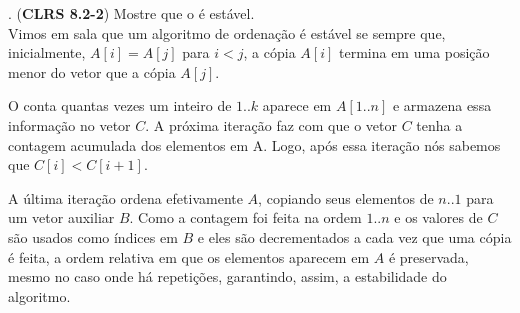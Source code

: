 
. (\textbf{CLRS 8.2-2}) Mostre que o  é estável.\\[6pt]

Vimos em sala que um algoritmo de ordenação é estável se sempre que, inicialmente, $A[i] = A[j]$ para $i < j$, a cópia $A[i]$ termina em uma posição menor do vetor que a cópia $A[j]$. 

O  conta quantas vezes um inteiro de $1..k$ aparece em $A[1..n]$ e armazena essa informação no vetor $C$. A próxima iteração faz com que o vetor $C$ tenha a contagem acumulada dos elementos em A. Logo, após essa iteração nós sabemos que $C[i] < C[i + 1]$.

A última iteração ordena efetivamente $A$, copiando seus elementos de $n..1$ para um vetor auxiliar $B$. Como a contagem foi feita na ordem $1..n$ e os valores de $C$ são usados como índices em $B$ e eles são decrementados a cada vez que uma cópia é feita, a ordem relativa em que os elementos aparecem em $A$ é preservada, mesmo no caso onde há repetições, garantindo, assim, a estabilidade do algoritmo.\\[12pt]
